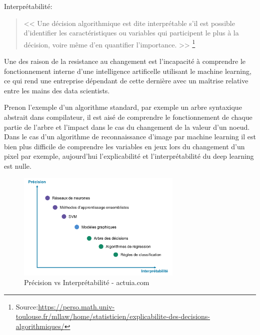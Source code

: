             Interprétabilité:
            \begin{quote}
                << Une décision algorithmique est dite interprétable s’il est possible d’identifier 
                les caractéristiques ou variables qui participent le plus à la décision, 
                voire même d’en quantifier l’importance. >>
                \footnote{Source:\url{https://perso.math.univ-toulouse.fr/mllaw/home/statisticien/explicabilite-des-decisions-algorithmiques/}}
                \newline
            \end{quote}

            Une des raison de la resistance au changement est l'incapacité à comprendre 
            le fonctionnement interne d'une intelligence artificelle utilisant le machine learning, 
            ce qui rend une entreprise dépendant de cette dernière avec un maîtrise relative
            entre les mains des data scientists. \newline

            Prenon l'exemple d'un algorithme standard, par exemple un arbre syntaxique abstrait
            dans compilateur, il est aisé de comprendre le fonctionnement de chaque partie 
            de l'arbre et l'impact dans le cas du changement de la valeur d'un noeud.
            Dans le cas d'un algorithme de reconnaissance d'image par machine learning 
            il est bien plus difficile de comprendre les variables en jeux lors du changement 
            d'un pixel par exemple, aujourd'hui l'explicabilité et l'interprétabilité
            du deep learning est nulle. \newline

            \begin{figure}[H]
                \centering
                \includegraphics[width=0.7\textwidth]{Images/accvsint}
                \caption{Précision vs Interprétabilité - actuia.com}
                \label{fig:explicability}
            \end{figure}

